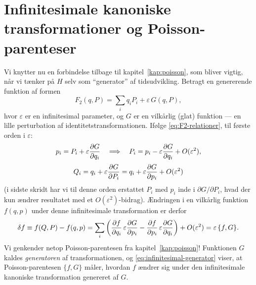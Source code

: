 \section{Infinitesimale kanoniske transformationer og Poisson-parenteser}

Vi knytter nu en forbindelse tilbage til kapitel~\ref{kap:poisson}, som
bliver vigtig, når vi tænker på $H$ selv som ``generator'' af
tidsudvikling. Betragt en genererende funktion af formen
\begin{equation}
  F_2(q,P) = \sum_i q_iP_i + \varepsilon\,G(q,P),
\end{equation}
hvor $\varepsilon$ er en infinitesimal parameter, og $G$ er en
vilkårlig (glat) funktion — en lille perturbation af
identitetstransformationen. Ifølge \eqref{eq:F2-relationer}, til
første orden i $\varepsilon$:
\begin{equation}
  p_i = P_i + \varepsilon\pdv{G}{q_i} \quad\Longrightarrow\quad P_i = p_i - \varepsilon\pdv{G}{q_i} + O(\varepsilon^2),
\end{equation}
\begin{equation}
  Q_i = q_i + \varepsilon\pdv{G}{P_i} = q_i + \varepsilon\pdv{G}{p_i} + O(\varepsilon^2)
\end{equation}
(i sidste skridt har vi til denne orden erstattet $P_i$ med $p_i$
inde i $\partial G/\partial P_i$, hvad der kun ændrer resultatet med et
$O(\varepsilon^2)$-bidrag). Ændringen i en vilkårlig funktion
$f(q,p)$ under denne infinitesimale transformation er derfor
\begin{equation}
  \delta f \equiv f(Q,P) - f(q,p)
  = \sum_i\left(\pdv{f}{q_i}\,\varepsilon\pdv{G}{p_i} - \pdv{f}{p_i}\,\varepsilon\pdv{G}{q_i}\right) + O(\varepsilon^2)
  = \varepsilon\,\{f,G\}.
  \label{eq:infinitesimal-generator}
\end{equation}
Vi genkender netop Poisson-parentesen fra kapitel~\ref{kap:poisson}!
Funktionen $G$ kaldes \emph{generatoren} af transformationen, og
\eqref{eq:infinitesimal-generator} viser, at Poisson-parentesen
$\{f,G\}$ måler, hvordan $f$ ændrer sig under den infinitesimale
kanoniske transformation genereret af $G$.

